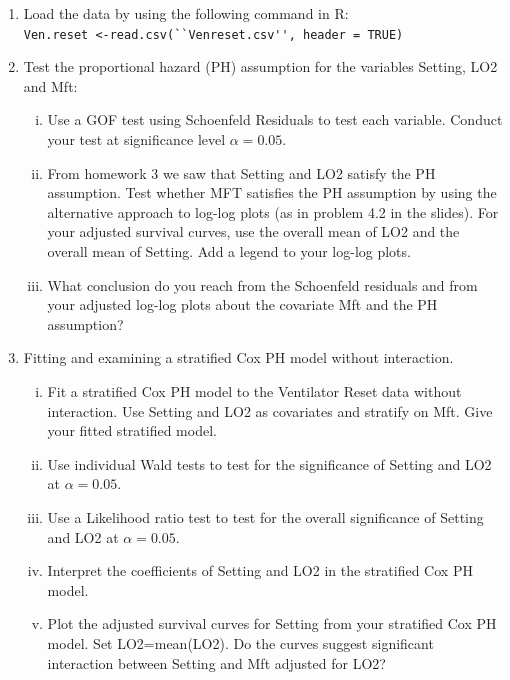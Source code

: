 \documentclass[12pt]{article}
\begin{document}
\begin{enumerate}[1.]
\item Load the data by using the following command in R: \\
 \lstinline{Ven.reset <-read.csv(``Venreset.csv'', header = TRUE)}

\item Test the proportional hazard (PH) assumption for the variables Setting, LO2 and Mft:
\begin{enumerate}[i.]
\item Use a GOF test using Schoenfeld Residuals to test each variable. Conduct your test at significance level $\alpha=0.05$.
\item From homework 3 we saw that Setting and LO2 satisfy the PH assumption.  Test whether MFT satisfies the PH assumption by using the alternative approach to log-log plots (as in problem 4.2 in the slides). For your adjusted survival curves, use the overall mean of LO2 and the overall mean of Setting. Add a legend to your log-log plots.
\item What conclusion do you reach from the Schoenfeld residuals and from your adjusted log-log plots about the covariate Mft and the PH assumption?
\end{enumerate}
\item Fitting and examining a stratified Cox PH model without interaction.
\begin{enumerate}[i.]
\item Fit a stratified Cox PH model to the Ventilator Reset data without interaction. Use Setting and LO2 as covariates and stratify on Mft. Give your fitted stratified model.
\item Use individual Wald tests to test for the significance of Setting and LO2 at $\alpha=0.05$.
\item Use a Likelihood ratio test to test for the overall significance of Setting and LO2 at $\alpha=0.05$. 
\item Interpret the coefficients of Setting and LO2 in the stratified Cox PH model. 
\item Plot the adjusted survival curves for Setting from your stratified Cox PH model. Set LO2=mean(LO2). Do the curves suggest significant interaction between Setting and Mft adjusted for LO2?
\end{enumerate}
\vspace{30pt}


\end{enumerate}
\end{document}
